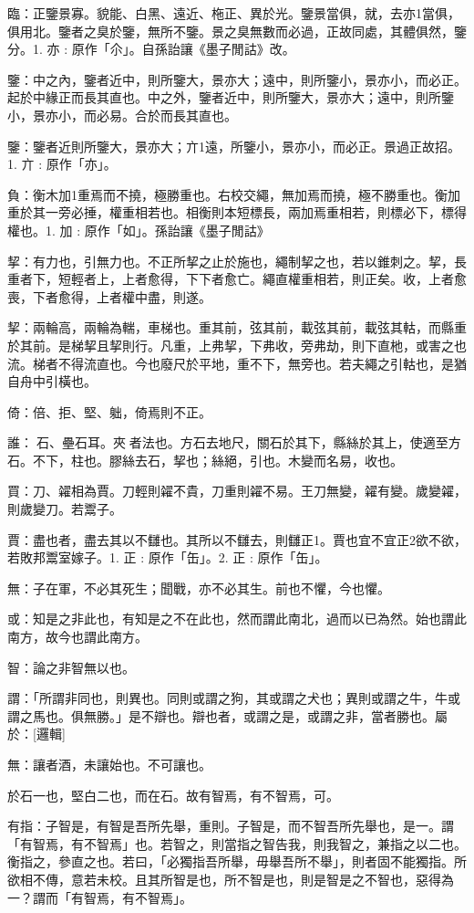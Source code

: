 \begin{pinyinscope}
臨：正鑒景寡。貌能、白黑、遠近、柂正、異於光。鑒景當俱，就，去亦1當俱，俱用北。鑒者之臭於鑒，無所不鑒。景之臭無數而必過，正故同處，其體俱然，鑒分。1. 亦 : 原作「尒」。自孫詒讓《墨子閒詁》改。

鑒：中之內，鑒者近中，則所鑒大，景亦大；遠中，則所鑒小，景亦小，而必正。起於中緣正而長其直也。中之外，鑒者近中，則所鑒大，景亦大；遠中，則所鑒小，景亦小，而必易。合於而長其直也。

鑒：鑒者近則所鑒大，景亦大；亣1遠，所鑒小，景亦小，而必正。景過正故招。1. 亣 : 原作「亦」。

負：衡木加1重焉而不撓，極勝重也。右校交繩，無加焉而撓，極不勝重也。衡加重於其一旁必捶，權重相若也。相衡則本短標長，兩加焉重相若，則標必下，標得權也。1. 加 : 原作「如」。孫詒讓《墨子閒詁》

挈：有力也，引無力也。不正所挈之止於施也，繩制挈之也，若以錐刺之。挈，長重者下，短輕者上，上者愈得，下下者愈亡。繩直權重相若，則正矣。收，上者愈喪，下者愈得，上者權中盡，則遂。

挈：兩輪高，兩輪為輲，車梯也。重其前，弦其前，載弦其前，載弦其軲，而縣重於其前。是梯挈且挈則行。凡重，上弗挈，下弗收，旁弗劫，則下直杝，或害之也流。梯者不得流直也。今也廢尺於平地，重不下，無旁也。若夫繩之引軲也，是猶自舟中引橫也。

倚：倍、拒、堅、䠳，倚焉則不正。

誰：𥩵石、壘石耳。夾𡨦者法也。方石去地尺，關石於其下，縣絲於其上，使適至方石。不下，柱也。膠絲去石，挈也；絲絕，引也。木變而名易，收也。

買：刀、糴相為賈。刀輕則糴不貴，刀重則糴不易。王刀無變，糴有變。歲變糴，則歲變刀。若鬻子。

賈：盡也者，盡去其以不讎也。其所以不讎去，則讎正1。賈也宜不宜正2欲不欲，若敗邦鬻室嫁子。1. 正 : 原作「缶」。2. 正 : 原作「缶」。

無：子在軍，不必其死生；聞戰，亦不必其生。前也不懼，今也懼。

或：知是之非此也，有知是之不在此也，然而謂此南北，過而以已為然。始也謂此南方，故今也謂此南方。

智：論之非智無以也。

謂：「所謂非同也，則異也。同則或謂之狗，其或謂之犬也；異則或謂之牛，牛或謂之馬也。俱無勝。」是不辯也。辯也者，或謂之是，或謂之非，當者勝也。屬於：[邏輯]

無：讓者酒，未讓始也。不可讓也。

於石一也，堅白二也，而在石。故有智焉，有不智焉，可。

有指：子智是，有智是吾所先舉，重則。子智是，而不智吾所先舉也，是一。謂「有智焉，有不智焉」也。若智之，則當指之智告我，則我智之，兼指之以二也。衡指之，參直之也。若曰，「必獨指吾所舉，毋舉吾所不舉」，則者固不能獨指。所欲相不傳，意若未校。且其所智是也，所不智是也，則是智是之不智也，惡得為一？謂而「有智焉，有不智焉」。


\end{pinyinscope}
